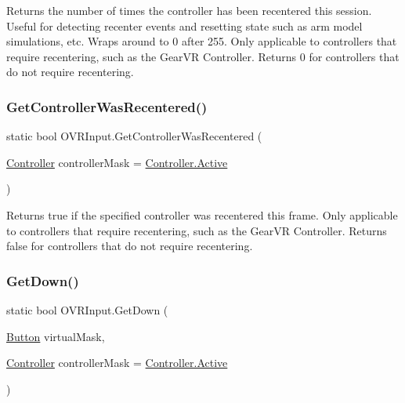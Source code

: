Returns the number of times the controller has been recentered this session. Useful for detecting recenter events and resetting state such as arm model simulations, etc. Wraps around to 0 after 255. Only applicable to controllers that require recentering, such as the Gear\+VR Controller. Returns 0 for controllers that do not require recentering. 

\mbox{\label{class_o_v_r_input_a07731a02d39af2a011d7579439dbeffd}} 
\subsubsection{\texorpdfstring{Get\+Controller\+Was\+Recentered()}{GetControllerWasRecentered()}}
{\footnotesize\ttfamily static bool O\+V\+R\+Input.\+Get\+Controller\+Was\+Recentered (\begin{DoxyParamCaption}\item[{\mbox{\hyperlink{class_o_v_r_input_a5c86f9052a9cbb0b73779ff5704d60a8}{Controller}}}]{controller\+Mask = {\ttfamily \mbox{\hyperlink{class_o_v_r_input_a5c86f9052a9cbb0b73779ff5704d60a8a4d3d769b812b6faa6b76e1a8abaece2d}{Controller.\+Active}}} }\end{DoxyParamCaption})\hspace{0.3cm}{\ttfamily [static]}}



Returns true if the specified controller was recentered this frame. Only applicable to controllers that require recentering, such as the Gear\+VR Controller. Returns false for controllers that do not require recentering. 

\mbox{\label{class_o_v_r_input_a9c2ccada669b0054fd25a82e84d659c9}} 
\subsubsection{\texorpdfstring{Get\+Down()}{GetDown()}\hspace{0.1cm}{\footnotesize\ttfamily [1/6]}}
{\footnotesize\ttfamily static bool O\+V\+R\+Input.\+Get\+Down (\begin{DoxyParamCaption}\item[{\mbox{\hyperlink{class_o_v_r_input_aed3cf5b4b5e0669cea0941f61e018ee5}{Button}}}]{virtual\+Mask,  }\item[{\mbox{\hyperlink{class_o_v_r_input_a5c86f9052a9cbb0b73779ff5704d60a8}{Controller}}}]{controller\+Mask = {\ttfamily \mbox{\hyperlink{class_o_v_r_input_a5c86f9052a9cbb0b73779ff5704d60a8a4d3d769b812b6faa6b76e1a8abaece2d}{Controller.\+Active}}} }\end{DoxyParamCaption})\hspace{0.3cm}{\ttfamily [static]}}



